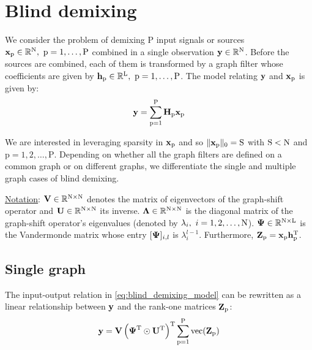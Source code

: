 \documentclass{article}
\newcommand{\numSources}{\text{P}}
\newcommand{\sourceIndex}{\text{p}}
\DeclareMathOperator{\vect}{vec}
\begin{document}
\section*{Blind demixing}

We consider the problem of demixing $\numSources$ input signals or sources $\bbx_{\sourceIndex} \in \mathbb{R}^{\rmN}, \ \sourceIndex=1,\ldots,\numSources$ combined in a single observation ${\mathbf y} \in \mathbb{R}^{{\text{N}}}$. Before the sources are combined, each of them is transformed by a graph filter whose coefficients are given by $\bbh_{\sourceIndex} \in \mathbb{R}^{\rmL}, \ \sourceIndex=1,\ldots,\numSources$. The model relating ${\mathbf y}$ and $\bbx_{\sourceIndex}$ is given by:
\begin{equation}
  \label{eq:blind_demixing_model}
  \bby = \sum_{\sourceIndex=1}^{\numSources} \bbH_{\sourceIndex} \bbx_{\sourceIndex}
\end{equation}

We are interested in leveraging sparsity in $\bbx_{\sourceIndex}$ and so $\|\bbx_{\sourceIndex}\|_{0}=\rmS$ with ${\text{S}} < {\text{N}}$ and $\sourceIndex=1,2,\ldots,\numSources$. Depending on whether all the graph filters are defined on a common graph or on different graphs, we differentiate the single and multiple graph cases of blind demixing.

\vspace{5mm}
\noindent
\underline{Notation}: ${\mathbf V} \in \mathbb{R}^{{\text{N}} \times {\ensuremath\text{N}}}$ denotes the matrix of eigenvectors of the graph-shift operator and ${\mathbf U} \in \mathbb{R}^{{\text{N}} \times {\ensuremath\text{N}}}$ its inverse. $\boldsymbol{\Lambda} \in \mathbb{R}^{{\text{N}} \times {\ensuremath\text{N}}}$ is the diagonal matrix of the graph-shift operator's eigenvalues (denoted by $\lambda_{i}, \ i=1,2,\ldots,\rmN$). $\boldsymbol{\Psi} \in \mathbb{R}^{{\text{N}} \times {\ensuremath\text{L}}}$ is the Vandermonde matrix whose entry $[\boldsymbol{\Psi}]_{i,l}$ is $\lambda_{i}^{l-1}$. Furthermore, $\bbZ_{\sourceIndex}=\bbx_{\sourceIndex} \bbh_{\sourceIndex}^{\rmT}$.

\subsection*{Single graph}

The input-output relation in \eqref{eq:blind_demixing_model} can be rewritten as a linear relationship between ${\mathbf y}$ and the rank-one matrices $\bbZ_{\sourceIndex}$:
\begin{equation}
  \label{eq:blind_demixing_sg_constraint}
  \bby = \bbV \left(\bbPsi^{\rmT} \odot \bbU^{\rmT} \right)^{\rmT}\sum_{\sourceIndex=1}^{\numSources} \vect(\bbZ_{\sourceIndex})
\end{equation}
\end{document}
